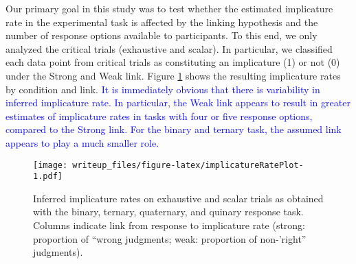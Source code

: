 \documentclass[man]{apa6}
\newcommand{\change}[1]{\textcolor{Blue}{#1}}
\theoremstyle{definition}
\theoremstyle{definition}
\theoremstyle{definition}
\theoremstyle{remark}
\begin{document}
Our primary goal in this study was to test whether the estimated
implicature rate in the experimental task is affected by the linking
hypothesis and the number of response options available to participants.
To this end, we only analyzed the critical trials (exhaustive and
scalar). In particular, we classified each data point from critical
trials as constituting an implicature (1) or not (0) under the Strong
and Weak link. Figure \ref{fig:implicatureRatePlot} shows the resulting
implicature rates by condition and link. \change{It is immediately obvious that there is variability in inferred implicature rate. In particular, the Weak link appears to result in greater estimates of
implicature rates in tasks with four or five response options, compared to the Strong link. For the binary and ternary task, the assumed link appears to play a much smaller role.}

\begin{figure}
\centering
\texttt{[image: writeup\_files/figure-latex/implicatureRatePlot-1.pdf]}
\caption{\label{fig:implicatureRatePlot}Inferred implicature rates on
exhaustive and scalar trials as obtained with the binary, ternary,
quaternary, and quinary response task. Columns indicate link from
response to implicature rate (strong: proportion of \enquote{wrong
judgments; weak: proportion of non-'right} judgments).}
\end{figure}
\end{document}

